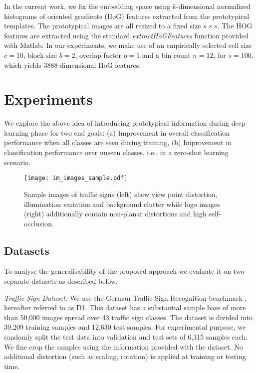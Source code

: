 \documentclass{bmvc2k}
\begin{document}
In the current work, we fix the embedding space using $k$-dimensional
normalized histograms of oriented gradients (HoG) {\cite{dalal2005histograms}} features
extracted from the prototypical templates. The prototypical images are all resized to a fixed size $s\times s$.
The HOG features are extracted using the standard \textit{extractHoGFeatures} function provided with Matlab. 
In our experiments, we make use of an empirically selected cell size $c=10$, block size $b=2$,  
overlap factor $o=1$ and a bin count $n=12$, for $s=100$, which yields $3888$-dimensional HoG features.

\section{\label{sec:Experiments}Experiments}
We explore the above idea of introducing prototypical information during deep learning phase for 
two end goals: (a) Improvement in overall classification performance when all classes are seen during 
training, (b) Improvement in classification performance over unseen classes,
i.e., in a zero-shot learning scenario.

\begin{figure}
  \centering
  \texttt{[image: im\_images\_sample.pdf]}
\caption{\label{fig:sampleimages}Sample images of traffic signs (left) show view
point distortion, illumination variation and background clutter while logo
images (right) additionally contain non-planar distortions and high
self-occlusion. }
\end{figure}\subsection{\label{}Datasets}
To analyse the generalisability of the proposed approach we evaluate it on two
separate datasets as described below.

\textit{Traffic Sign Dataset:} We use the German Traffic Sign Recognition
benchmark \cite{stallkamp2012manvscomp}, hereafter referred to as D1. This dataset has a substantial 
sample base of more than 50,000 images spread over 43 traffic sign classes. 
The dataset is divided into 39,209 training samples and 12,630 test samples. 
For experimental purpose, we randomly split the test data into validation and 
test sets of 6,315 samples each. We fine crop the samples using the information provided with the 
dataset. No additional distortion (such as scaling, rotation) is applied at training or testing time. 
\end{document}
